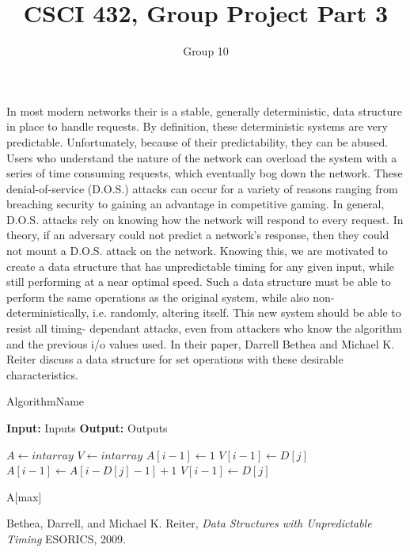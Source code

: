 \documentclass[11pt]{article}
\title{CSCI 432, Group Project Part 3}
\author{Group 10}
\begin{document}
\maketitle



In most modern networks their is a stable, generally deterministic, data
structure in place to handle requests. By definition, these
deterministic systems are very predictable. Unfortunately, because of their
predictability, they can be abused. Users who understand the nature of 
the network can overload the system with a series of time consuming
requests, which eventually bog down the network. These denial-of-service
(D.O.S.) attacks can occur for a variety of reasons ranging from 
breaching security to gaining an advantage in competitive gaming. In 
general, D.O.S. attacks rely on knowing how the network will respond to 
every request. In theory, if an adversary could not predict a network's 
response, then they could not mount a D.O.S. attack on the network. 
Knowing this, we are motivated to 
create a data structure that has unpredictable timing 
for any given input, while still performing at a near optimal speed. 
Such a data structure must be able to perform the same operations as 
the original system, while also non-deterministically, i.e. randomly, 
altering itself. This new system should be able to resist all timing-
dependant attacks,
even from attackers who know the algorithm and the previous i/o values used.
In their paper, Darrell Bethea and Michael K. Reiter discuss a data
structure for set operations with these desirable characteristics\cite{Bethea09}.



\begin{algorithm}
\caption{AlgorithmName}
\textbf{Input:} Inputs
\textbf{Output:} Outputs

\begin{algorithmic}[1]
\State $A \gets intarray$
\State $V \gets intarray$
			\State $A[i-1] \gets 1$
			\State $V[i-1] \gets D[j]$
			\State $A[i-1] \gets A[i-D[j]-1]+1$
			\State $V[i-1] \gets D[j]$
			\EndIf
		\EndIf
	\EndFor
\EndFor

\Return A[max]
\end{algorithmic}
\end{algorithm}

\pagebreak

\begin{thebibliography}{9}
	
	Bethea, Darrell, and Michael K. Reiter,
	\emph{Data Structures with Unpredictable Timing}
	ESORICS,
	2009.
	
\end{thebibliography}
\end{document}
